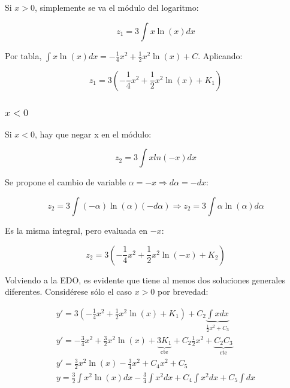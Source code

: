 \documentclass{article}
\begin{document}
Si $x > 0$, simplemente se va el módulo del logaritmo:

\begin{equation}
z_1 = 3 \int x \ln(x) dx
\end{equation}

Por tabla, $\int x \ln(x) dx = -\frac{1}{4} x^2 + \frac{1}{2} x^2 \ln(x) + C$. Aplicando:

\begin{equation}
z_1 = 3  \left( -\frac{1}{4} x^2 + \frac{1}{2} x^2 \ln (x) + K_1 \right)
\end{equation}

\subsubsection{\texorpdfstring{$x < 0$}{x < 0}}

Si $x < 0$, hay que negar x en el módulo:

\begin{equation}
z_2 = 3 \int x ln(-x) dx 
\end{equation}

Se propone el cambio de variable $\alpha = -x \Rightarrow d\alpha = -dx$:

\begin{equation}
z_2 = 3 \int (-\alpha) \ln(\alpha) (-d\alpha) \Rightarrow z_2 = 3 \int \alpha \ln(\alpha) d\alpha
\end{equation}

Es la misma integral, pero evaluada en $-x$:

\begin{equation}
z_2 = 3 \left( -\frac{1}{4} x^2 + \frac{1}{2} x^2 \ln(-x) + K_2 \right)
\end{equation}

Volviendo a la EDO, es evidente que tiene al menos dos soluciones generales diferentes. Considérese sólo el caso $x>0$ por brevedad:

\begin{gather}
y' = 3 \left( -\frac{1}{4} x^2 + \frac{1}{2} x^2 \ln (x) + K_1 \right) + C_2 \underbrace{\int x dx}_{\frac{1}{2} x^2 + C_3} \\
y' = -\frac{3}{4} x^2 + \frac{3}{2} x^2 \ln(x) + \underbrace{3 K_1}_{\text{cte}} + C_2 \frac{1}{2} x^2 + \underbrace{C_2 C_3}_{\text{cte}} \\
y' = \frac{3}{2} x^2 \ln(x) - \frac{3}{4} x^2 + C_4 x^2 + C_5 \\
y = \frac{3}{2} \int x^2 \ln(x) dx -\frac{3}{4} \int x^2 dx + C_4 \int x^2 dx + C_5 \int dx 
\end{gather}
\end{document}
